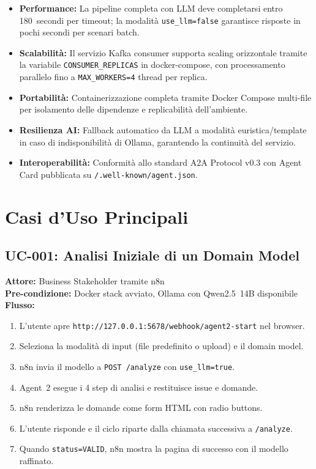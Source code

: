 \documentclass[12pt,a4paper]{report}
\begin{document}
\begin{itemize}
  \item \textbf{Performance:} La pipeline completa con LLM deve completarsi entro
        180~secondi per timeout; la modalità \texttt{use\_llm=false} garantisce
        risposte in pochi secondi per scenari batch.

  \item \textbf{Scalabilità:} Il servizio Kafka consumer supporta scaling orizzontale
        tramite la variabile \texttt{CONSUMER\_REPLICAS} in docker-compose, con
        processamento parallelo fino a \texttt{MAX\_WORKERS=4} thread per replica.

  \item \textbf{Portabilità:} Containerizzazione completa tramite Docker Compose
        multi-file per isolamento delle dipendenze e replicabilità dell'ambiente.

  \item \textbf{Resilienza AI:} Fallback automatico da LLM a modalità euristica/template
        in caso di indisponibilità di Ollama, garantendo la continuità del servizio.

  \item \textbf{Interoperabilità:} Conformità allo standard A2A Protocol v0.3
        con Agent Card pubblicata su \texttt{/.well-known/agent.json}.
\end{itemize}

\section{Casi d'Uso Principali}

\subsection{UC-001: Analisi Iniziale di un Domain Model}

\textbf{Attore:} Business Stakeholder tramite n8n \\
\textbf{Pre-condizione:} Docker stack avviato, Ollama con Qwen2.5~14B disponibile \\
\textbf{Flusso:}
\begin{enumerate}
  \item L'utente apre \texttt{http://127.0.0.1:5678/webhook/agent2-start} nel browser.
  \item Seleziona la modalità di input (file predefinito o upload) e il domain model.
  \item n8n invia il modello a \texttt{POST /analyze} con \texttt{use\_llm=true}.
  \item Agent~2 esegue i 4 step di analisi e restituisce issue e domande.
  \item n8n renderizza le domande come form HTML con radio buttons.
  \item L'utente risponde e il ciclo riparte dalla chiamata successiva a \texttt{/analyze}.
  \item Quando \texttt{status=VALID}, n8n mostra la pagina di successo con il modello raffinato.
\end{enumerate}
\end{document}
